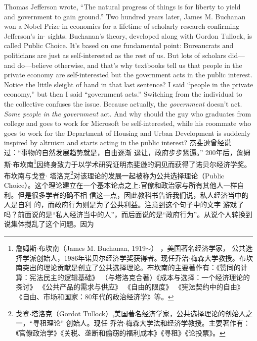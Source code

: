 \begin{paracol}{2}
Thomas Jefferson wrote, ``The natural progress of things is for
liberty to yield and government to gain ground.'' Two hundred
years later, James M. Buchanan won a Nobel Prize in economics for a lifetime of scholarly research confirming Jefferson's in-
sights. Buchanan's theory, developed along with Gordon
Tullock, is called Public Choice. It's based on one fundamental
point: Bureaucrats and politicians are just as self-interested as
the rest of us. But lots of scholars did---and do---believe otherwise, and that's why textbooks tell us that people in the private
economy are self-interested but the government acts in the
public interest. Notice the little sleight of hand in that last sentence? I said ``people in the private economy,'' but then I said
``government acts.'' Switching from the individual to the collective confuses the issue. Because actually, the \textit{government} doesn't
act.\textit{ Some people in the government} act. And why should the guy
who graduates from college and goes to work for Microsoft be
self-interested, while his roommate who goes to work for the
Department of Housing and Urban Development is suddenly
inspired by altruism and starts acting in the public interest?
\switchcolumn
杰斐逊曾经说过：“事物的自然发展趋势就是，自由逐渐
退让，政府步步紧逼。” 200年后，詹姆斯$\cdot$布坎南\footnote{詹姆斯$\cdot$布坎南（James M. Buchanan, 1919$\sim$） ，美国著名经济学家，	公共选择学派创始人，1986年诺贝尔经济学奖获得者。现任乔治$\cdot$梅森大学教授。布坎南突出的理论贡献是创立了公共选择理论。布坎南的主要著作有：《赞同的计算：宪法民主的逻辑基础》 （与塔洛克合著）《成本与选择：一个经济理论的探讨》 《公共产品的需求与供应》 《自由的限度》 《宪法契约中的自由》 《自由、市场和国家：80年代的政治经济学》等。}因终身致力于以学术研究证明杰斐逊的洞见而获得了诺贝尔经济学奖。布坎南与戈登$\cdot$ 塔洛克\footnote{戈登$\cdot$塔洛克（Gordot Tullock）,美国著名经济学家，公共选择理论的创始人之一，“寻租理论” 创始人。现任 乔治$\cdot$梅森大学法和经济学教授。主要著作有：《官僚政治学》《关税、垄断和偷窃的福利成本》《寻租》《论投票》。}对该理论的发展一起被称为公共选择理论（Public Choice）。这个理论建立在一个基本论点之上:官僚和政治家与所有其他人一样自利。但是很多学者的确不相
信这一点，因此教科书告诉我们说，私人经济当中的人是自利
的，而政府行为则是为了公共利益。注意到这个句子中的文字
游戏了吗？前面说的是“私人经济当中的人”，而后面说的是“政府行为”。从说个人转换到说集体搅乱了这个问题。因为

\end{paracol}
